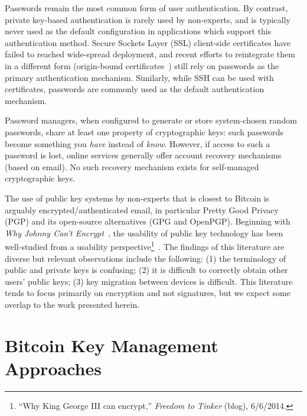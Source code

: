 Passwords remain the most common form of user authentication. By contrast, private key-based authentication is rarely used by non-experts, and is typically never used as the default configuration in applications which support this authentication method. Secure Sockets Layer (SSL) client-side certificates have failed to reached wide-spread deployment, and recent efforts to reintegrate them in a different form (\eg origin-bound certificates~\cite{DCBW12}) still rely on passwords as the primary authentication mechanism. Similarly, while SSH can be used with certificates, passwords are commonly used as the default authentication mechanism.

Password managers, when configured to generate or store system-chosen random passwords, share at least one property of cryptographic keys: such passwords become something you \emph{have} instead of \emph{know}. However, if access to such a password is lost, online services generally offer account recovery mechanisms (\eg based on email). No such recovery mechanism exists for self-managed cryptographic keys.

The use of public key systems by non-experts that is closest to Bitcoin is arguably encrypted/authenticated email, in particular Pretty Good Privacy (PGP) and its open-source alternatives (\ie GPG and OpenPGP). Beginning with \emph{Why Johnny Can't Encrypt}~\cite{WT99}, the usability of public key technology has been well-studied from a usability perspective\footnote{``Why King George III can encrypt,'' \textit{Freedom to Tinker} (blog), 6/6/2014.}~\cite{GM05,GMSN+05,SBKH06,GFF06}. The findings of this literature are diverse but relevant observations include the following: (1) the terminology of public and private keys is confusing; (2) it is difficult to correctly obtain other users' public keys; (3) key migration between devices is difficult. This literature tends to focus primarily on encryption and not signatures, but we expect some overlap to the work presented herein. 


\section{Bitcoin Key Management Approaches} 
\label{sec:approaches}


